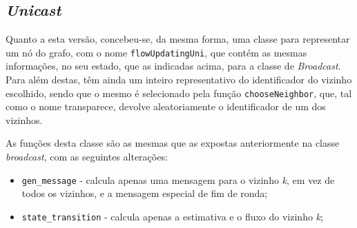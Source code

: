 \documentclass[a4paper]{report}
\begin{document}
{		\subsection{\textit{Unicast}} \label{subsec:Unicast}
		Quanto a esta versão, concebeu-se, da mesma forma, uma classe para representar um nó do grafo, com o nome \texttt{flowUpdatingUni}, que contém as mesmas informações, no seu estado, que as indicadas acima, para a classe de \textit{Broadcast}.
		Para além destas, têm ainda um inteiro representativo do identificador do vizinho escolhido, sendo que o mesmo é selecionado pela função \texttt{chooseNeighbor}, que, tal como o nome transparece, devolve aleatoriamente o identificador de um dos vizinhos.

		As funções desta classe são as mesmas que as expostas anteriormente na classe \textit{broadcast}, com as seguintes alterações:
		\begin{itemize}
			\item \texttt{gen\_message} - calcula apenas uma mensagem para o vizinho \textit{k}, em vez de todos os vizinhos, e a mensagem especial de fim de ronda;
			\item \texttt{state\_transition} - calcula apenas a estimativa e o fluxo do vizinho \textit{k};
		\end{itemize}
}
\end{document}
